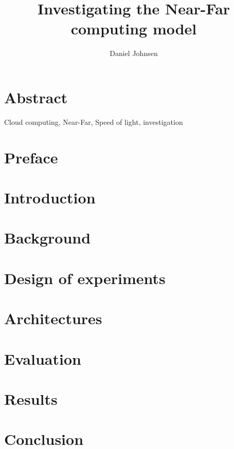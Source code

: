 \documentclass[UKenglish]{duo/ifimaster}  %
\title{Investigating the Near-Far computing model}        %
\author{Daniel Johnsen}                      %
\begin{document}
\duoforside[dept={Department of Informatics},   %
  program={Programming and System architecture},  %
  long]                                        %

\frontmatter{}
\chapter*{Abstract}
Cloud computing, Near-Far, Speed of light, investigation
\tableofcontents{}
\listoffigures{}
\listoftables{}

\chapter*{Preface}

\mainmatter{}


\chapter{Introduction}


\chapter{Background}
 


\chapter{Design of experiments}\label{design_of_experiments}




\chapter{Architectures}\label{architectures} %


\chapter{Evaluation}\label{evaluation}



\chapter{Results}                     %

\chapter{Conclusion}                     %


\backmatter{}
\printbibliography
\end{document}
